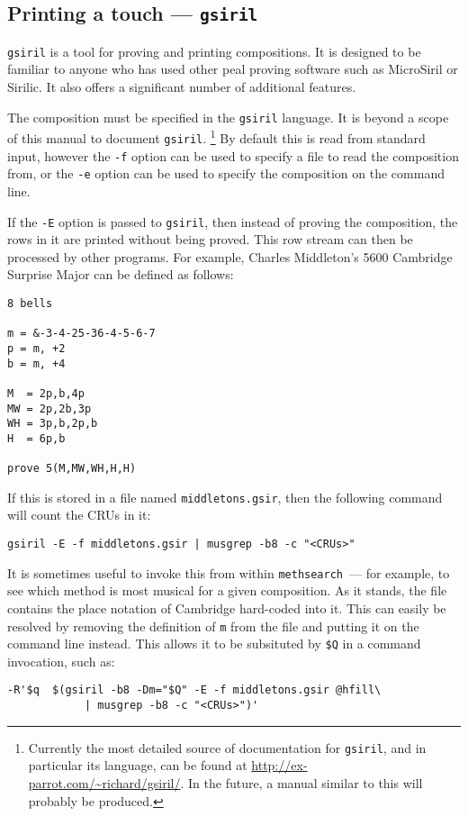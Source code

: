 \documentclass[a4paper,11pt,oneside]{book}
\makeatletter
\newcommand{\fspec}[1]{\index{#1@{\hspace*{-\fspecwidth}\texttt{\$#1}}}}
\newcommand{\ttcmdidx}[1]{\texttt{#1}\index{#1@{\texttt{#1}}}}
\def\methsearch{\texttt{meth\-search}}
\makeatother
\begin{document}
\subsection{Printing a touch — \texttt{gsiril}}\label{gsirilrow}

\ttcmdidx{gsiril} is a tool for proving and printing compositions.  
It is designed to be familiar to anyone who has used other peal
proving software such as MicroSiril or 
Sirilic.  It also offers a significant
number of additional features.

The composition must be specified in the \texttt{gsiril} language.
It is beyond a scope of this manual to document \texttt{gsiril}.%
\footnote{Currently the most detailed source of documentation for 
\texttt{gsiril}, and in particular its language, can be found at 
\url{http://ex-parrot.com/~richard/gsiril/}.  In the future, a manual
similar to this will probably be produced.}
By default this is read from standard input, however the \verb+-f+ option
can be used to specify a file to read the composition from, or the \verb+-e+ 
option can be used to specify the composition on the command line.

If the \verb+-E+ option is passed to \texttt{gsiril}, then instead of 
proving the composition, the rows in it are printed without being proved.
This row stream can then be processed by other programs.  For example,
Charles Middleton's 
5600 Cambridge Surprise Major can be defined as 
follows:
\begin{Verbatim}
8 bells

m = &-3-4-25-36-4-5-6-7
p = m, +2
b = m, +4

M  = 2p,b,4p
MW = 2p,2b,3p
WH = 3p,b,2p,b
H  = 6p,b

prove 5(M,MW,WH,H,H)
\end{Verbatim}
If this is stored in a file named \texttt{middletons.gsir}, then the 
following command will count the CRUs in it:
\begin{Verbatim}
gsiril -E -f middletons.gsir | musgrep -b8 -c "<CRUs>"
\end{Verbatim}

It is sometimes useful to invoke this from within \methsearch\ --- for 
example, to see which method is most musical for a given composition.  As
it stands, the file contains the place notation of
Cambridge hard-coded into it.  This can easily be resolved by removing
the definition of \verb+m+ from the file and putting it on the command line
instead.  This allows it to be subsituted by \verb+$Q+\fspec{Q} in a
command invocation, such as:
\begin{Verbatim}[commandchars=@~~]
-R'$q  $(gsiril -b8 -Dm="$Q" -E -f middletons.gsir @hfill\
            | musgrep -b8 -c "<CRUs>")'
\end{Verbatim}
\end{document}

